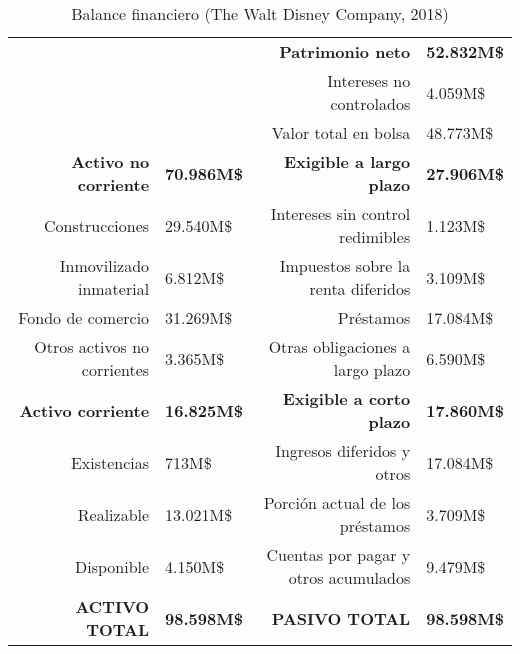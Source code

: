 \begin{table}[]
\centering
\begin{tabular}{rlrl}
 & & \textbf{Patrimonio neto} & \textbf{52.832M\$} \\
 & & Intereses no controlados & 4.059M\$ \\
 & & Valor total en bolsa & 48.773M\$ \\
\textbf{Activo no corriente} & \textbf{70.986M\$}& \textbf{Exigible a largo plazo} & \textbf{27.906M\$} \\
Construcciones & 29.540M\$ & Intereses sin control redimibles & 1.123M\$ \\
Inmovilizado inmaterial & 6.812M\$ & Impuestos sobre la renta diferidos & 3.109M\$ \\
Fondo de comercio & 31.269M\$ & Préstamos & 17.084M\$ \\
Otros activos no corrientes & 3.365M\$ & Otras obligaciones a largo plazo & 6.590M\$ \\
\textbf{Activo corriente} & \textbf{16.825M\$} & \textbf{Exigible a corto plazo} & \textbf{17.860M\$} \\
Existencias & 713M\$ & Ingresos diferidos y otros & 17.084M\$ \\
Realizable & 13.021M\$ & Porción actual de los préstamos & 3.709M\$ \\
Disponible & 4.150M\$ & Cuentas por pagar y otros acumulados & 9.479M\$ \\
\textbf{ACTIVO TOTAL} & \textbf{98.598M\$} & \textbf{PASIVO TOTAL} & \textbf{98.598M\$}
\end{tabular}
\caption{\label{fig:frog}Balance financiero (The Walt Disney Company, 2018)}
\end{table}